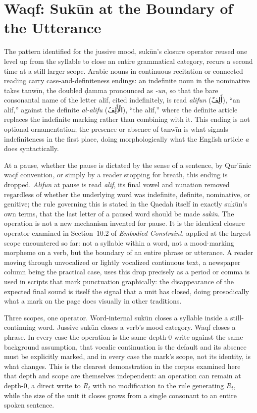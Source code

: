 \documentclass[11pt]{article}
\newcommand{\ar}[1]{\textarabic{#1}}
\begin{document}
\section{Waqf: Sukūn at the Boundary of the Utterance}

The pattern identified for the jussive mood, sukūn's closure operator
reused one level up from the syllable to close an entire grammatical
category, recurs a second time at a still larger scope. Arabic nouns in
continuous recitation or connected reading carry case-and-definiteness
endings: an indefinite noun in the nominative takes tanwīn, the doubled
ḍamma pronounced as \emph{-un}, so that the bare consonantal name of the
letter alif, cited indefinitely, is read \emph{alifun} (\ar{أَلِفٌ}), \textquotedblleft an
alif,\textquotedblright{} against the definite \emph{al-alifu} (\ar{الْأَلِفُ}),
\textquotedblleft the alif,\textquotedblright{} where the definite article
replaces the indefinite marking rather than combining with it. This ending
is not optional ornamentation; the presence or absence of tanwīn is what
signals indefiniteness in the first place, doing morphologically what the
English article \emph{a} does syntactically.

At a pause, whether the pause is dictated by the sense of a sentence,
by Qur'ānic waqf convention, or simply by a reader stopping for breath,
this ending is dropped. \emph{Alifun} at pause is read \emph{alif}, its
final vowel and nunation removed regardless of whether the underlying word
was indefinite, definite, nominative, or genitive; the rule governing this
is stated in the Qaedah itself in exactly sukūn's own terms, that the last
letter of a paused word should be made \emph{sakin}. The operation is not a
new mechanism invented for pause. It is the identical closure operator
examined in Section~10.2 of \emph{Embodied Constraint}, applied at the
largest scope encountered so far: not a syllable within a word, not a
mood-marking morpheme on a verb, but the boundary of an entire phrase or
utterance. A reader moving through unvocalized or lightly vocalized
continuous text, a newspaper column being the practical case, uses this
drop precisely as a period or comma is used in scripts that mark
punctuation graphically: the disappearance of the expected final sound is
itself the signal that a unit has closed, doing prosodically what a mark on
the page does visually in other traditions.

Three scopes, one operator. Word-internal sukūn closes a syllable inside a
still-continuing word. Jussive sukūn closes a verb's mood category. Waqf
closes a phrase. In every case the operation is the same depth-0 write
against the same background assumption, that vocalic continuation is the
default and its absence must be explicitly marked, and in every case the
mark's scope, not its identity, is what changes. This is the clearest
demonstration in the corpus examined here that depth and scope are
themselves independent: an operation can remain at depth-0, a direct write
to $R_t$ with no modification to the rule generating $R_t$, while the size
of the unit it closes grows from a single consonant to an entire spoken
sentence.
\end{document}
